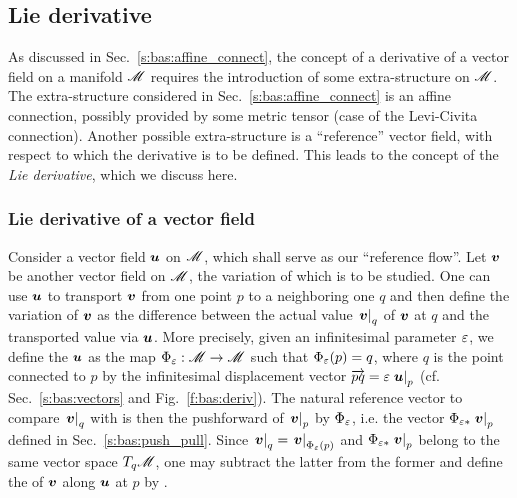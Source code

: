 \subsection{Lie derivative} \label{s:bas:Lie}

As discussed in Sec.~\ref{s:bas:affine_connect}, the concept of a derivative of a vector field on a manifold $\mathscr{M}$
requires the introduction of some extra-structure on $\mathscr{M}$. The extra-structure considered in
Sec.~\ref{s:bas:affine_connect} is an affine connection, possibly
provided by some metric tensor (case of the Levi-Civita connection).
Another possible extra-structure is a ``reference''
vector field, with respect to which the derivative is to be defined. This leads to the
concept of the \emph{Lie derivative}, which we discuss here.


\subsubsection{Lie derivative of a vector field} \label{s:bas:Lie_der_vector}

Consider a vector field $\bm{u}$ on $\mathscr{M}$, which shall serve as our ``reference flow''.
Let $\bm{v}$ be another vector field on $\mathscr{M}$, the variation of which is to be studied.
One can use $\bm{u}$ to transport $\bm{v}$ from one point $p$ to
a neighboring one $q$ and then define the variation of $\bm{v}$
as the difference between the actual value $\left. \bm{v} \right| _q$ of $\bm{v}$ at $q$ and the transported
value via $\bm{u}$. More precisely, given an infinitesimal
parameter $\varepsilon$, we define the  $\bm{u}$
as the map $\Phi_\varepsilon: \mathscr{M} \to \mathscr{M}$ such that
$\Phi_\varepsilon(p)=q$, where $q$ is the point connected to $p$ by the infinitesimal
displacement vector
$\overrightarrow{pq}=\varepsilon \left. \bm{u} \right| _p$ (cf. Sec.~\ref{s:bas:vectors} and
Fig.~\ref{f:bas:deriv}).
The natural reference vector to compare $\left. \bm{v} \right| _q$ with is then the
pushforward of
$\left. \bm{v} \right| _p$ by $\Phi_\varepsilon$, i.e. the vector
$\Phi_{\varepsilon*} \left. \bm{v} \right| _p$ defined in Sec.~\ref{s:bas:push_pull}.
Since $\left. \bm{v} \right| _q = \left. \bm{v} \right| _{\Phi_\varepsilon(p)}$ and
$\Phi_{\varepsilon*} \left. \bm{v} \right| _p$ belong to the same vector space $T_q\mathscr{M}$,
one may subtract the latter from the former and define
the 
of $\bm{v}$ along $\bm{u}$ at $p$ by
\be \label{e:bas:def_Lie_der}
    .
\ee

